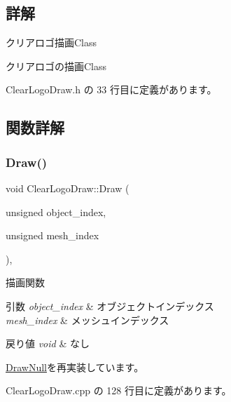 \subsection{詳解}
クリアロゴ描画\+Class 

クリアロゴの描画\+Class 

 Clear\+Logo\+Draw.\+h の 33 行目に定義があります。



\subsection{関数詳解}
\mbox{\label{class_clear_logo_draw_ab018f370071f370ae7016d8ee402c456}} 
\subsubsection{\texorpdfstring{Draw()}{Draw()}}
{\footnotesize\ttfamily void Clear\+Logo\+Draw\+::\+Draw (\begin{DoxyParamCaption}\item[{unsigned}]{object\+\_\+index,  }\item[{unsigned}]{mesh\+\_\+index }\end{DoxyParamCaption})\hspace{0.3cm}{\ttfamily [override]}, {\ttfamily [virtual]}}



描画関数 


\begin{DoxyParams}{引数}
{\em object\+\_\+index} & オブジェクトインデックス \\
\hline
{\em mesh\+\_\+index} & メッシュインデックス \\
\hline
\end{DoxyParams}

\begin{DoxyRetVals}{戻り値}
{\em void} & なし \\
\hline
\end{DoxyRetVals}


\mbox{\hyperlink{class_draw_null_a72ac0b7dc40b1469582419dcc5b0e114}{Draw\+Null}}を再実装しています。



 Clear\+Logo\+Draw.\+cpp の 128 行目に定義があります。

\mbox{\label{class_clear_logo_draw_ad58068c5cfa0236b559e3a5b526b22d7}} 
